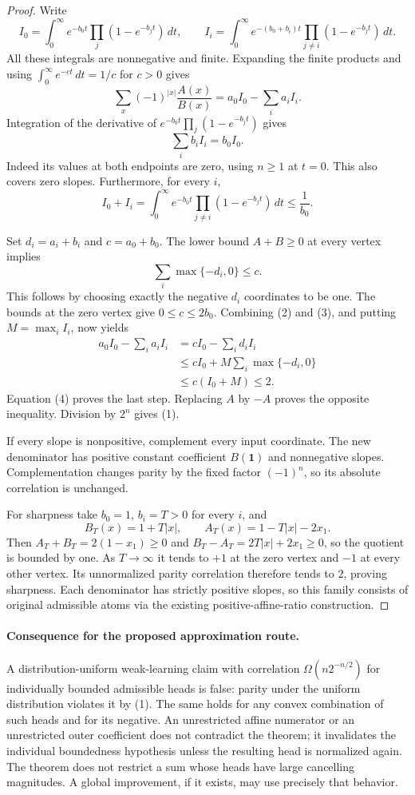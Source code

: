 \documentclass[11pt]{article}
\begin{document}
\begin{proof}
Write
\[
 I_0=\int_0^\infty e^{-b_0t}\prod_j(1-e^{-b_jt})\,dt,
 \qquad
 I_i=\int_0^\infty e^{-(b_0+b_i)t}
                    \prod_{j\ne i}(1-e^{-b_jt})\,dt.
\]
All these integrals are nonnegative and finite. Expanding the finite
products and using $\int_0^\infty e^{-ct}\,dt=1/c$ for $c>0$ gives
\[
 \sum_x(-1)^{|x|}\frac{A(x)}{B(x)}
           =a_0I_0-\sum_i a_i I_i.
 \tag{2}
\]
Integration of the derivative of
$e^{-b_0t}\prod_j(1-e^{-b_jt})$ gives
\[
                 \sum_i b_iI_i=b_0I_0.
 \tag{3}
\]
Indeed its values at both endpoints are zero, using $n\geq1$ at
$t=0$. This also covers zero slopes. Furthermore, for every $i$,
\[
 I_0+I_i
 =\int_0^\infty e^{-b_0t}\prod_{j\ne i}(1-e^{-b_jt})\,dt
 \leq\frac1{b_0}.
 \tag{4}
\]

Set $d_i=a_i+b_i$ and $c=a_0+b_0$. The lower bound $A+B\geq0$
at every vertex implies
\[
             \sum_i\max\{-d_i,0\}\leq c.
 \tag{5}
\]
This follows by choosing exactly the negative $d_i$ coordinates to be
one. The bounds at the zero vertex give $0\leq c\leq2b_0$.
Combining (2) and (3), and putting $M=\max_i I_i$, now yields
\[
 \begin{aligned}
 a_0I_0-\sum_i a_iI_i
 &=cI_0-\sum_i d_iI_i\\
 &\leq cI_0+M\sum_i\max\{-d_i,0\}\\
 &\leq c(I_0+M)\leq 2.
 \end{aligned}
\]
Equation (4) proves the last step. Replacing $A$ by $-A$ proves the
opposite inequality. Division by $2^n$ gives (1).

If every slope is nonpositive, complement every input coordinate.
The new denominator has positive constant coefficient $B(\mathbf1)$
and nonnegative slopes. Complementation changes parity by the fixed
factor $(-1)^n$, so its absolute correlation is unchanged.

For sharpness take $b_0=1$, $b_i=T>0$ for every $i$, and
\[
 B_T(x)=1+T|x|,\qquad
 A_T(x)=1-T|x|-2x_1.
\]
Then $A_T+B_T=2(1-x_1)\geq0$ and
$B_T-A_T=2T|x|+2x_1\geq0$, so the quotient is bounded by one.
As $T\to\infty$ it tends to $+1$ at the zero vertex and $-1$ at
every other vertex. Its unnormalized parity correlation therefore
tends to $2$, proving sharpness. Each denominator has strictly
positive slopes, so this family consists of original admissible
atoms via the existing positive-affine-ratio construction.
\end{proof}

\paragraph{Consequence for the proposed approximation route.}
A distribution-uniform weak-learning claim with correlation
$\Omega(n2^{-n/2})$ for individually bounded admissible heads is false:
parity under the uniform distribution violates it by (1). The same
holds for any convex combination of such heads and for its negative.
An unrestricted affine numerator or an unrestricted outer coefficient
does not contradict the theorem; it invalidates the individual
boundedness hypothesis unless the resulting head is normalized again.
The theorem does not restrict a sum whose heads have large cancelling
magnitudes. A global improvement, if it exists, may use precisely that
behavior.
\end{document}
